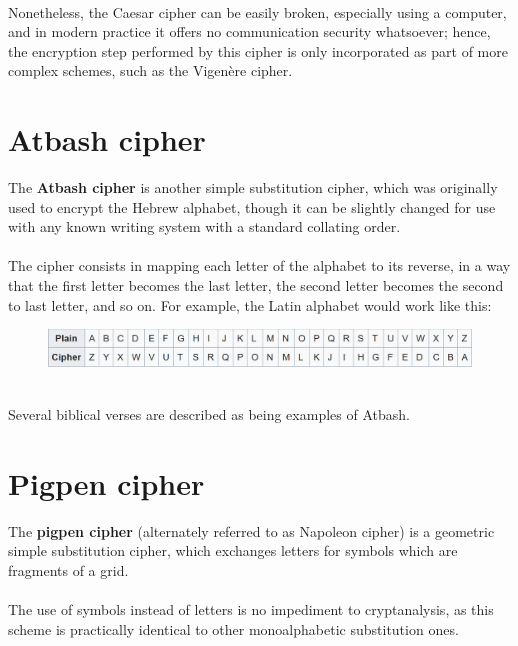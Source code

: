\documentclass[Lau,binding=0.6cm,oneside]{sapthesis}
\begin{document}
\ \\
Nonetheless, the Caesar cipher can be easily broken, especially using a computer, and in modern practice it offers no communication security whatsoever; hence, the encryption step performed by this cipher is only incorporated as part of more complex schemes, such as the Vigenère cipher.

\section{Atbash cipher}
The \textbf{Atbash cipher} is another simple substitution cipher, which was originally used to encrypt the Hebrew alphabet, though it can be slightly changed for use with any known writing system with a standard collating order.\\\\
The cipher consists in mapping each letter of the alphabet to its reverse, in a way that the first letter becomes the last letter, the second letter becomes the second to last letter, and so on. For example, the Latin alphabet would work like this: \\

\begin{figure}[H]
\includegraphics[scale=0.65]{atbash_cipher}
\centering
\caption{}
\centering
\end{figure}

\ \\
Several biblical verses are described as being examples of Atbash\supercite{atbash}.\\

\section{Pigpen cipher}
The \textbf{pigpen cipher} (alternately referred to as Napoleon cipher) is a geometric simple substitution cipher, which exchanges letters for symbols which are fragments of a grid.\\\\
The use of symbols instead of letters is no impediment to cryptanalysis, as this scheme is practically identical to other monoalphabetic substitution ones.\\\\
\end{document}
